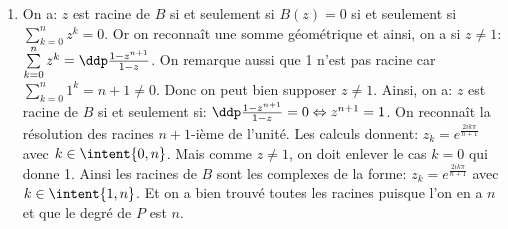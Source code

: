 \documentclass[a4paper, 11pt,reqno]{article}
\begin{document}
\begin{correction}
\begin{enumerate}
\begin{enumerate}
\begin{itemize}
				                  avec $k^{\prime}\in\Z$. Or $k\in\intent{ 0,n-1}$ donc le seul $k$ qui v\'erifie cela est $k=0$.
				                  \begin{itemize}
					                  \item[$\star$] Pour $k=0$, on obtient: $0=2$ donc il n'y a pas de solution pour $k=0$.
					                  \item[$\star$] Pour $k\not= 0$, \`{a} savoir pour $k\in\intent{ 1,n-1}$, on sait que $1- e^{\frac{2ik\pi}{n}}\not= 0$ et on peut donc bien diviser. On obtient
					                        $$z=\ddp\frac{e^{\frac{2ik\pi}{n}}+1}{e^{\frac{2ik\pi}{n}} -1}=-icot{\left( \ddp\frac{k\pi}{n} \right)}$$
					                        en utilisant la m\'ethode de l'angle moiti\'e.
				                  \end{itemize}
				            \item[$\bullet$] Les racines de $A$ sont donc $z=-i\cot{\left( \ddp\frac{k\pi}{n} \right)} $ avec $k\in\intent{ 1,n-1}$. On les bien toutes trouv\'ees puisque l'on en a $n-1$ et que le polyn\^{o}me est de degr\'e $n-1$.
			            \end{itemize}
			      \item On a: $z$ est racine de $B$ si et seulement si $B(z)=0$ si et seulement si $\sum\limits_{k=0}^n z^k=0$. Or on reconna\^{i}t une somme g\'eom\'etrique et ainsi, on a si $z\not= 1$: $\sum\limits_{k=0}^n z^k=\ddp\frac{1-z^{n+1}}{1-z}$. On remarque aussi que 1 n'est pas racine car $\sum\limits_{k=0}^n 1^k=n+1\not= 0$. Donc on peut bien supposer $z\not=1$. Ainsi, on a: $z$ est racine de $B$ si et seulement si: $\ddp\frac{1-z^{n+1}}{1-z}=0\Leftrightarrow z^{n+1}=1$. On reconna\^{i}t la r\'esolution des racines $n+1$-i\`{e}me de l'unit\'e. Les calculs donnent: $z_k=e^{\frac{2ik\pi}{n+1}}$ avec $k\in\intent{ 0,n}$. Mais comme $z\not= 1$, on doit enlever le cas $k=0$ qui donne 1. Ainsi les racines de $B$ sont les complexes de la forme:
			            $z_k=e^{\frac{2ik\pi}{n+1}}$ avec $k\in\intent{ 1,n}$. Et on a bien trouv\'e toutes les racines puisque l'on en a $n$ et que le degr\'e de $P$ est $n$.
		      \end{enumerate}
	\end{enumerate}
\end{correction}
\end{document}
